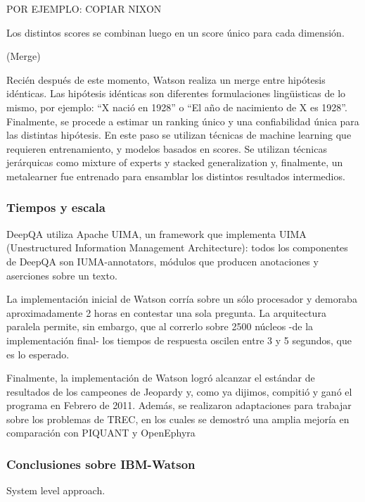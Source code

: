 POR EJEMPLO: COPIAR NIXON

Los distintos scores se combinan luego en un score único para cada
dimensión.

(Merge)

Recién después de este momento, Watson realiza un merge entre
hipótesis idénticas. Las hipótesis idénticas son diferentes
formulaciones ling\"uisticas de lo mismo, por ejemplo:
{\textquotedblleft}X nació en 1928{\textquotedblright} o
{\textquotedblleft}El año de nacimiento de X es
1928{\textquotedblright}. Finalmente, se procede a estimar un ranking
único y una confiabilidad única para las distintas hipótesis. En
este paso se utilizan técnicas de machine learning que requieren
entrenamiento, y modelos basados en scores. Se utilizan técnicas
jerárquicas como mixture of experts y stacked generalization y,
finalmente, un metalearner fue entrenado para ensamblar los distintos
resultados intermedios. 


\bigskip

\subsubsection*{Tiempos y escala}

DeepQA utiliza Apache UIMA, un framework que implementa UIMA
(Unestructured Information Management Architecture): todos los
componentes de DeepQA son IUMA-annotators, módulos que producen
anotaciones y aserciones sobre un texto.

La implementación inicial de Watson corría sobre un sólo
procesador y demoraba aproximadamente 2 horas en contestar una sola
pregunta. La arquitectura paralela permite, sin embargo, que al
correrlo sobre 2500 núcleos -de la implementación final- los
tiempos de respuesta oscilen entre 3 y 5 segundos, que es lo esperado.

Finalmente, la implementación de Watson logró alcanzar el estándar
de resultados de los campeones de Jeopardy y, como ya dijimos,
compitió y ganó el programa en Febrero de 2011. Además, se
realizaron adaptaciones para trabajar sobre los problemas de TREC, en
los cuales se demostró una amplia mejoría en comparación con
PIQUANT y OpenEphyra


\bigskip

\subsubsection*{Conclusiones sobre IBM-Watson}

System level approach.



